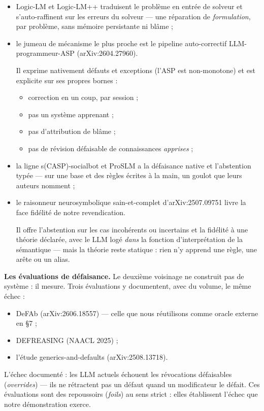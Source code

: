 \documentclass[11pt]{article}
\begin{document}
\begin{itemize}
\item Logic-LM et Logic-LM++ traduisent le problème en entrée de solveur et s'auto-raffinent sur les erreurs du solveur — une réparation de \emph{formulation}, par problème, sans mémoire persistante ni blâme ;
\item le jumeau de mécanisme le plus proche est le pipeline auto-correctif LLM-programmeur-ASP (arXiv:2604.27960). \par Il exprime nativement défauts et exceptions (l'ASP est non-monotone) et est explicite sur ses propres bornes :

\begin{itemize}
\item correction en un coup, par session ;
\item pas un système apprenant ;
\item pas d'attribution de blâme ;
\item pas de révision défaisable de connaissances \emph{apprises} ;

\end{itemize}
\item la ligne s(CASP)-socialbot et ProSLM a la défaisance native et l'abstention typée — sur une base et des règles écrites à la main, un goulot que leurs auteurs nomment ;
\item le raisonneur neurosymbolique sain-et-complet d'arXiv:2507.09751 livre la face fidélité de notre revendication. \par Il offre l'abstention sur les cas incohérents ou incertains et la fidélité à une théorie déclarée, avec le LLM logé \emph{dans} la fonction d'interprétation de la sémantique — mais la théorie reste statique : rien n'y apprend une règle, une arête ou un alias.
\end{itemize}

\textbf{Les évaluations de défaisance.} Le deuxième voisinage ne construit pas de système : il mesure. Trois évaluations y documentent, avec du volume, le même échec :

\begin{itemize}
\item DeFAb (arXiv:2606.18557) — celle que nous réutilisons comme oracle externe en §7 ;
\item DEFREASING (NAACL 2025) ;
\item l'étude generics-and-defaults (arXiv:2508.13718).
\end{itemize}

L'échec documenté : les LLM actuels échouent les révocations défaisables (\emph{overrides}) — ils ne rétractent pas un défaut quand un modificateur le défait. Ces évaluations sont des repoussoirs (\emph{foils}) au sens strict : elles établissent l'échec que notre démonstration exerce.
\end{document}
